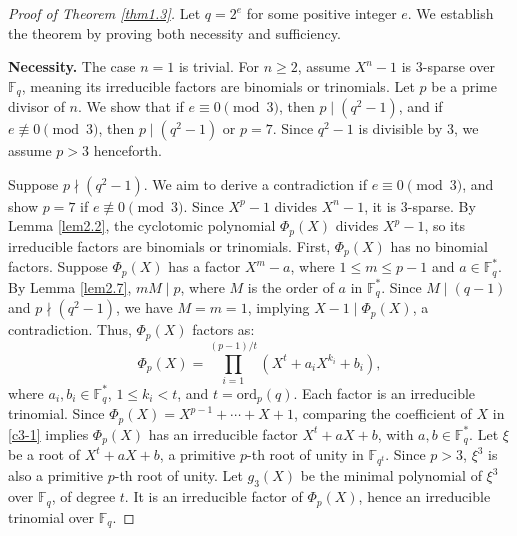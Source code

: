 \documentclass[10pt,reqno]{amsart}
\theoremstyle{definition}
\theoremstyle{remark}
\numberwithin{equation}{section}
\begin{document}
\begin{proof}[Proof of Theorem \ref{thm1.3}]
Let $q = 2^e$ for some positive integer $e$. We establish the theorem by proving both necessity and sufficiency.

\textbf{Necessity.} The case $n=1$ is trivial. For $n \geq 2$, assume $X^n - 1$ is 3-sparse over $\mathbb{F}_q$, meaning its irreducible factors are binomials or trinomials. Let $p$ be a prime divisor of $n$. We show that if $e \equiv 0 \pmod{3}$, then $p \mid (q^2 - 1)$, and if $e \not\equiv 0 \pmod{3}$, then $p \mid (q^2 - 1)$ or $p = 7$. Since $q^2 - 1$ is divisible by 3, we assume $p > 3$ henceforth.

Suppose $p \nmid (q^2 - 1)$. We aim to derive a contradiction if $e \equiv 0 \pmod{3}$, and show $p = 7$ if $e \not\equiv 0 \pmod{3}$. Since $X^p - 1$ divides $X^n - 1$, it is 3-sparse. By Lemma \ref{lem2.2}, the cyclotomic polynomial $\Phi_p(X)$ divides $X^p - 1$, so its irreducible factors are binomials or trinomials. First, $\Phi_p(X)$ has no binomial factors. Suppose $\Phi_p(X)$ has a factor $X^m - a$, where $1 \leq m \leq p-1$ and $a \in \mathbb{F}_q^*$. By Lemma \ref{lem2.7}, $m M \mid p$, where $M$ is the order of $a$ in $\mathbb{F}_q^*$. Since $M \mid (q - 1)$ and $p \nmid (q^2 - 1)$, we have $M = m = 1$, implying $X - 1 \mid \Phi_p(X)$, a contradiction. Thus, $\Phi_p(X)$ factors as:
\begin{equation}\label{c3-1}
\Phi_p(X) = \prod_{i=1}^{(p-1)/t} (X^t + a_i X^{k_i} + b_i),
\end{equation}
where $a_i, b_i \in \mathbb{F}_q^*$, $1 \leq k_i < t$, and $t = \text{ord}_p(q)$. Each factor is an irreducible trinomial. Since $\Phi_p(X) = X^{p-1} + \cdots + X + 1$, comparing the coefficient of $X$ in \eqref{c3-1} implies $\Phi_p(X)$ has an irreducible factor $X^t + a X + b$, with $a, b \in \mathbb{F}_q^*$. Let $\xi$ be a root of $X^t + a X + b$, a primitive $p$-th root of unity in $\mathbb{F}_{q^t}$. Since $p > 3$, $\xi^3$ is also a primitive $p$-th root of unity. Let $g_3(X)$ be the minimal polynomial of $\xi^3$ over $\mathbb{F}_q$, of degree $t$. It is an irreducible factor of $\Phi_p(X)$, hence an irreducible trinomial over $\mathbb{F}_q$.


\end{proof}
\end{document}

